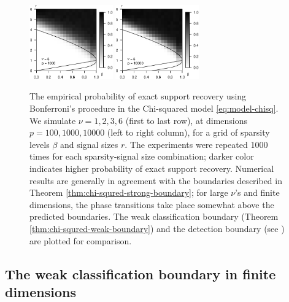 \begin{figure}
      \includegraphics[width=0.32\textwidth]{./sim_strong_boundary/simulated_phase_diagram_chi-squared_nu6_p1000.eps}
      \includegraphics[width=0.32\textwidth]{./sim_strong_boundary/simulated_phase_diagram_chi-squared_nu6_p10000.eps}
      \caption{The empirical probability of exact support recovery using Bonferroni's procedure in the Chi-squared model \eqref{eq:model-chisq}. 
      We simulate $\nu=1, 2, 3, 6$ (first to last row), at dimensions $p=100, 1000, 10000$ (left to right column), for a grid of sparsity levels $\beta$ and signal sizes $r$.
      The experiments were repeated 1000 times for each sparsity-signal size combination; darker color indicates higher probability of exact support recovery.  
      Numerical results are generally in agreement with the boundaries described in Theorem \ref{thm:chi-squred-strong-boundary}; for large $\nu$'s and finite dimensions, the phase transitions take place somewhat above the predicted boundaries.
      The weak classification boundary (Theorem \ref{thm:chi-squred-weak-boundary}) and the detection boundary (see \citep{donoho2004higher}) are plotted for comparison.} 
      \label{fig:phase-simulated-chi-squared}
\end{figure}



\subsection{The weak classification boundary in finite dimensions}


